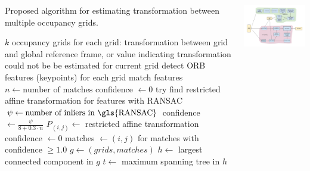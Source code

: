 \documentclass[17pt, a0paper, portrait]{tikzposter}
\begin{document}
\begin{columns}
{\begin{algorithm}[H]
    \caption{Proposed algorithm for estimating transformation between multiple occupancy grids.}
    \label{alg:estimategridtrasform}
    \begin{algorithmic}[1]
        \Require $k$ occupancy grids
        \Ensure for each grid: transformation between grid and global reference frame, or value indicating transformation could not be be estimated for current grid
            \State detect \gls{ORB} features (keypoints) for each grid
             
                \State match features
                \State $n \gets \text{number of matches}$
                    \State confidence $\gets 0$
                \Else
                    \State try find restricted affine transformation for features with \gls{RANSAC}
                    \State $\psi \gets \text{number of inliers in \gls{RANSAC}}$
                        \State confidence $\gets \frac{\psi}{8 + 0.3 \cdot n}$
                        \State $P_{(i,j)} \gets$ restricted affine transformation
                    \Else
                        \State confidence $\gets 0$
                    \EndIf
                \EndIf
            \EndFor
            \State matches $\gets (i,j)$ for matches with confidence $\ge 1.0$
            \State $g \gets (grids, matches)$
            \State $h \gets$ largest connected component in $g$
            \State $t \gets$ maximum spanning tree in $h$
            \State {} 
        \EndProcedure
    \end{algorithmic}
\end{algorithm}


\begin{tikzfigure}
    \centering
    \includegraphics[width=\linewidth]{../img/StitchingPipeline.png}
    \label{fig:opencv}
\end{tikzfigure}


}
\end{columns}
\end{document}
